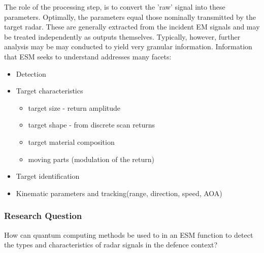 The role of the processing step, is to convert the 'raw' signal into these parameters. Optimally, the parameters equal those nominally transmitted by the target radar.
These are generally extracted from the incident \ac{EM} signals and may be treated independently as outputs themselves. Typically, however, further analysis may be may conducted to yield very granular information. Information that \ac{ESM} seeks to understand addresses many facets:
\begin{itemize}
    \item {}Detection
    \item Target characteristics \cite{jenn_radar_2007}
    \begin{itemize}
        \item target size - return amplitude
        \item target shape - from discrete scan returns
        \item target material composition
        \item moving parts (modulation of the return)
    \end{itemize}
    \item Target identification
    \item Kinematic parameters and tracking(range, direction, speed, \ac{AOA})
\end{itemize}


\subsubsection{Research Question}
How can quantum computing methods be used to in an ESM function to detect the types and characteristics of radar signals in the defence context?

